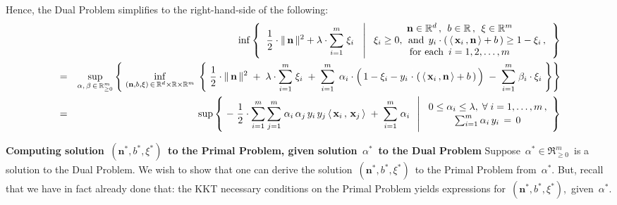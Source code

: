 Hence, the Dual Problem simplifies to the right-hand-side of the following:
\begin{eqnarray*}
&&
	\inf
	\left\{\;\;
		\dfrac{1}{2}\cdot\Vert\,\mathbf{n}\,\Vert^{2}
		+
		\lambda\cdot\overset{m}{\underset{i=1}{\sum}}\;\xi_{i}
		\;\;\,\left\vert\;
		\begin{array}{c}
			\mathbf{n} \in \Re^{d} \,,\;\, b \in \Re \,,\;\, \xi \in \Re^{m}
			\\
			\xi_{i} \geq 0,\;\,\textnormal{and}\;\,
			y_{i}\cdot\left(\,\langle\,\mathbf{x}_{i}\,,\mathbf{n}\,\rangle + b\,\right) \geq 1 - \xi_{i}\,,
			\\
			\textnormal{for each \,$i = 1,2,\ldots,m$}
			\end{array}
			\right.
		\right\}
\\
& = &
	\underset{\alpha,\,\beta\,\in\,\Re_{\geq 0}^{m}}{\sup}
	\left\{\;
		\underset{(\mathbf{n},b,\xi)\,\in\,\Re^{d}\times\Re\times\Re^{m}}{\inf}\;
		\left\{\;
			\dfrac{1}{2}\cdot\Vert\,\mathbf{n}\,\Vert^{2}
			\; + \;
			\lambda\cdot\overset{m}{\underset{i=1}{\sum}}\;\xi_{i}
			\; + \;
			\overset{m}{\underset{i = 1}{\sum}}\;\,
				\alpha_{i}
				\cdot
				\left(\,
					1 - \xi_{i}
					-
					y_{i}\overset{{\color{white}1}}{\cdot}\left(\,
						\langle\,\mathbf{x}_{i}\,,\mathbf{n}\,\rangle + b
						\,\right)
					\,\right)
			\; - \;
			\overset{m}{\underset{i = 1}{\sum}}\;
				\beta_{i}
				\cdot
				\xi_{i}
			\;\right\}
		\right\}
\\
& = &
	\sup
	\left\{\,
	\left.
		-\;\dfrac{1}{2}\cdot
		\overset{m}{\underset{i=1}{\sum}}\,
		\overset{m}{\underset{j=1}{\sum}}\;
		\alpha_{i}\,\alpha_{j}\,y_{i}\,y_{j}\,\langle\,\mathbf{x}_{i}\,,\,\mathbf{x}_{j}\,\rangle
		\; + \;
		\overset{m}{\underset{i = 1}{\sum}}\;\alpha_{i}
	\;\;\,\right\vert\,
		\begin{array}{c}
			0 \leq \alpha_{i} \leq \lambda,\;\forall\;i =1,\ldots,m\,,
			\\
			\sum_{i=1}^{m}\alpha_{i}\,y_{i} \,=\, \overset{{\color{white}.}}{0}
		\end{array}
		\right\}
\end{eqnarray*}


\vskip 0.5cm
\noindent
\textbf{Computing solution \,$(\mathbf{n}^{*},b^{*},\xi^{*})$\, to the Primal Problem, given solution \,$\alpha^{*}$\, to the Dual Problem}
\vskip 0.1cm
\noindent
Suppose \,$\alpha^{*} \in \Re_{\geq 0}^{m}$\, is a solution to the Dual Problem.
We wish to show that one can derive the solution \,$(\mathbf{n}^{*},b^{*},\xi^{*})$\, to the Primal Problem
from \,$\alpha^{*}$.
But, recall that we have in fact already done that:
the KKT necessary conditions on the Primal Problem yields expressions
for \,$(\mathbf{n}^{*},b^{*},\xi^{*})$,\, given \,$\alpha^{*}$.

